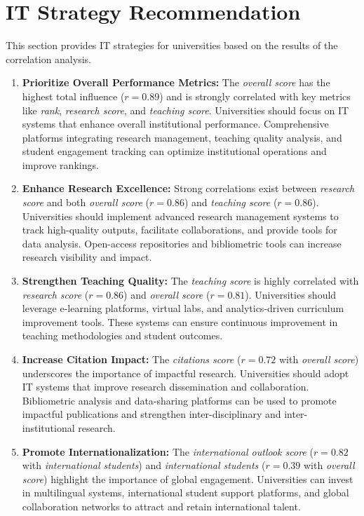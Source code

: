 \documentclass[sigconf]{acmart}
\begin{document}
\section{IT Strategy Recommendation}

This section provides IT strategies for universities based on the results of the correlation analysis.

\begin{enumerate}
	\item \textbf{Prioritize Overall Performance Metrics:} The \textit{overall score} has the highest total influence (\(r = 0.89\)) and is strongly correlated with key metrics like \textit{rank}, \textit{research score}, and \textit{teaching score}. Universities should focus on IT systems that enhance overall institutional performance. Comprehensive platforms integrating research management, teaching quality analysis, and student engagement tracking can optimize institutional operations and improve rankings.
	
	\item \textbf{Enhance Research Excellence:} Strong correlations exist between \textit{research score} and both \textit{overall score} (\(r = 0.86\)) and \textit{teaching score} (\(r = 0.86\)). Universities should implement advanced research management systems to track high-quality outputs, facilitate collaborations, and provide tools for data analysis. Open-access repositories and bibliometric tools can increase research visibility and impact.
	
	\item \textbf{Strengthen Teaching Quality:} The \textit{teaching score} is highly correlated with \textit{research score} (\(r = 0.86\)) and \textit{overall score} (\(r = 0.81\)). Universities should leverage e-learning platforms, virtual labs, and analytics-driven curriculum improvement tools. These systems can ensure continuous improvement in teaching methodologies and student outcomes.
	
	\item \textbf{Increase Citation Impact:} The \textit{citations score} (\(r = 0.72\) with \textit{overall score}) underscores the importance of impactful research. Universities should adopt IT systems that improve research dissemination and collaboration. Bibliometric analysis and data-sharing platforms can be used to promote impactful publications and strengthen inter-disciplinary and inter-institutional research.
	
	\item \textbf{Promote Internationalization:} The \textit{international outlook score} (\(r = 0.82\) with \textit{international students}) and \textit{international students} (\(r = 0.39\) with \textit{overall score}) highlight the importance of global engagement. Universities can invest in multilingual systems, international student support platforms, and global collaboration networks to attract and retain international talent.
	

\end{enumerate}
\end{document}

